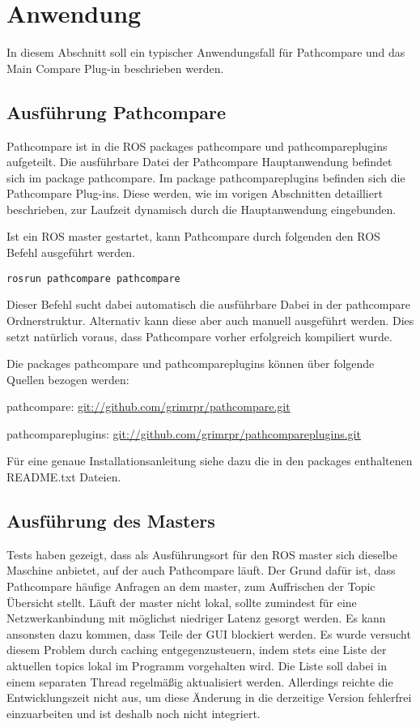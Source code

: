 \chapter{Anwendung}
\label{sec:andwendung}
In diesem Abschnitt soll ein typischer Anwendungsfall für Pathcompare und das
Main Compare Plug-in beschrieben werden. 

\section{Ausführung Pathcompare}

Pathcompare ist in die ROS packages pathcompare und pathcompareplugins
aufgeteilt. Die ausführbare Datei der Pathcompare Hauptanwendung befindet sich
im package pathcompare. Im package pathcompareplugins befinden sich die
Pathcompare Plug-ins. Diese werden, wie im vorigen Abschnitten detailliert
beschrieben, zur Laufzeit dynamisch durch die Hauptanwendung eingebunden.

Ist ein ROS master gestartet, kann Pathcompare durch folgenden den ROS Befehl
ausgeführt werden.

\begin{lstlisting}[caption=starting pathcompare, label=lst:rosrun]
rosrun pathcompare pathcompare
\end{lstlisting}

Dieser Befehl sucht dabei automatisch die ausführbare Dabei in der pathcompare
Ordnerstruktur. Alternativ kann diese aber auch manuell ausgeführt werden.
Dies setzt natürlich voraus, dass Pathcompare vorher erfolgreich kompiliert
wurde. 

Die packages pathcompare und pathcompareplugins können über folgende Quellen bezogen
werden:

pathcompare:
\url{git://github.com/grimrpr/pathcompare.git}

pathcompareplugins:
\url{git://github.com/grimrpr/pathcompareplugins.git}


Für eine genaue Installationsanleitung siehe dazu 
die in den packages enthaltenen README.txt Dateien.



\section{Ausführung des Masters}

Tests haben gezeigt, dass als Ausführungsort für den ROS master sich dieselbe
Maschine anbietet, auf der auch Pathcompare läuft. Der Grund dafür ist, dass
Pathcompare häufige Anfragen an dem master, zum Auffrischen der Topic
Übersicht stellt. Läuft der master nicht lokal, sollte zumindest für eine
Netzwerkanbindung mit möglichst niedriger Latenz gesorgt werden. Es kann
ansonsten dazu kommen, dass Teile der GUI blockiert werden. Es wurde versucht
diesem Problem durch caching entgegenzusteuern, indem stets eine Liste der
aktuellen topics lokal im Programm vorgehalten wird. Die Liste soll dabei in einem
separaten Thread regelmäßig aktualisiert werden. Allerdings reichte die
Entwicklungszeit nicht aus, um diese Änderung in die derzeitige Version
fehlerfrei einzuarbeiten und ist deshalb noch nicht integriert. 


